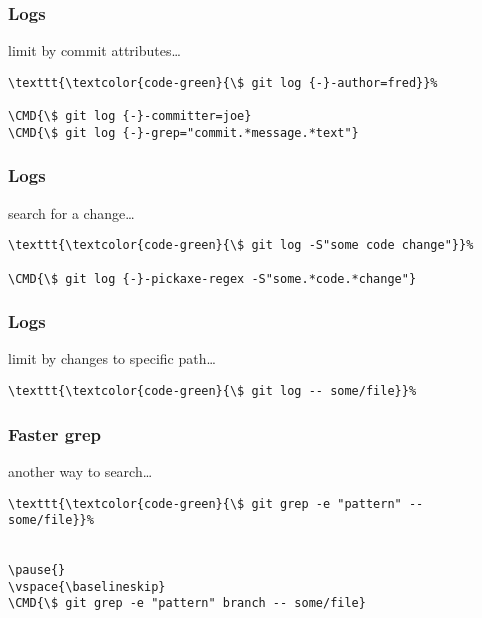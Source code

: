 \documentclass[english]{beamer}
\newcommand{\CMD}[1]{%
\texttt{\textcolor{code-green}{#1}}%
}
\begin{document}
\begin{frame}[fragile]
\frametitle{Logs}

limit by commit attributes\ldots
\vspace{\baselineskip}

\begin{Verbatim}[commandchars=\\\{\}]
\CMD{\$ git log {-}-author=fred}
\CMD{\$ git log {-}-committer=joe}
\CMD{\$ git log {-}-grep="commit.*message.*text"}
\end{Verbatim}

\vspace{\textheight}
\end{frame}

\begin{frame}[fragile]
\frametitle{Logs}

search for a change\ldots
\vspace{\baselineskip}

\begin{Verbatim}[commandchars=\\\{\}]
\CMD{\$ git log -S"some code change"}
\CMD{\$ git log {-}-pickaxe-regex -S"some.*code.*change"}
\end{Verbatim}

\vspace{\textheight}
\end{frame}

\begin{frame}[fragile]
\frametitle{Logs}

limit by changes to specific path\ldots
\vspace{\baselineskip}

\begin{Verbatim}[commandchars=\\\{\}]
\CMD{\$ git log -- some/file}
\end{Verbatim}

\vspace{\textheight}
\end{frame}

\begin{frame}[fragile]
\frametitle{Faster grep}

another way to search\ldots
\vspace{\baselineskip}

\begin{Verbatim}[commandchars=\\\{\}]
\CMD{\$ git grep -e "pattern" -- some/file}

\pause{}
\vspace{\baselineskip}
\CMD{\$ git grep -e "pattern" branch -- some/file}
\end{Verbatim}

\vspace{\textheight}
\end{frame}
\end{document}
